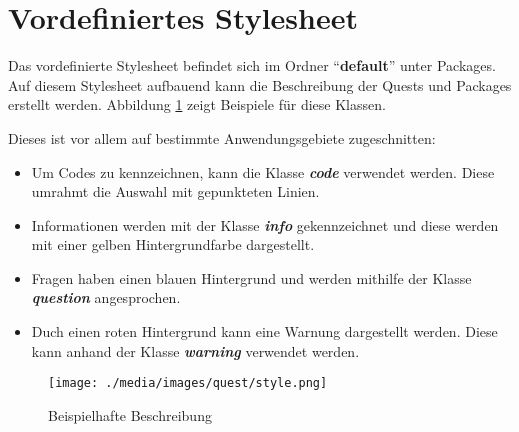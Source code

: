 \section{Vordefiniertes Stylesheet}

Das vordefinierte Stylesheet befindet sich im Ordner "`\textbf{default}"' unter Packages. Auf diesem Stylesheet aufbauend kann die Beschreibung der Quests und Packages erstellt werden. Abbildung \ref{fig:defaut_stylesheet} zeigt Beispiele für diese Klassen.

Dieses ist vor allem auf bestimmte Anwendungsgebiete zugeschnitten:
\begin{itemize}
\item Um Codes zu kennzeichnen, kann die Klasse \textit{\textbf{code}} verwendet werden. Diese umrahmt die Auswahl mit gepunkteten Linien.
\item Informationen werden mit der Klasse \textit{\textbf{info}} gekennzeichnet und diese werden mit einer gelben Hintergrundfarbe dargestellt.
\item Fragen haben einen blauen Hintergrund und werden mithilfe der Klasse \textit{\textbf{question}} angesprochen.
\item Duch einen roten Hintergrund kann eine Warnung dargestellt werden. Diese kann anhand der Klasse \textit{\textbf{warning}} verwendet werden.
\end{itemize}

\begin{figure}[h] 
  \centering
     \texttt{[image: ./media/images/quest/style.png]}
  \caption{Beispielhafte Beschreibung}
  \label{fig:defaut_stylesheet}
\end{figure}